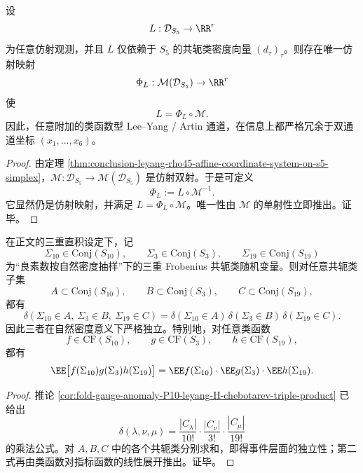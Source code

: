 \begin{theorem}[类函数型附加通道对双通道坐标的严格仿射冗余]\label{thm:conclusion-leyang-s5-classfunction-channels-factor-through-double-coordinates}
设
\[
L:\mathcal D_{S_5}\to \RR^r
\]
为任意仿射观测，并且 \(L\) 仅依赖于 \(S_5\) 的共轭类密度向量 \((d_\tau)_\tau\)。则存在唯一仿射映射
\[
\Phi_L:\mathcal M(\mathcal D_{S_5})\to \RR^r
\]
使
\[
L=\Phi_L\circ \mathcal M.
\]
因此，任意附加的类函数型 Lee--Yang / Artin 通道，在信息上都严格冗余于双通道坐标 \((x_1,\dots,x_6)\)。
\end{theorem}
\begin{proof}
由定理 \ref{thm:conclusion-leyang-rho45-affine-coordinate-system-on-s5-simplex}，\(\mathcal M:\mathcal D_{S_5}\to \mathcal M(\mathcal D_{S_5})\) 是仿射双射。于是可定义
\[
\Phi_L:=L\circ \mathcal M^{-1}.
\]
它显然仍是仿射映射，并满足 \(L=\Phi_L\circ \mathcal M\)。唯一性由 \(\mathcal M\) 的单射性立即推出。证毕。
\end{proof}

\begin{theorem}[算术三通道的精确张量独立]\label{thm:conclusion-leyang-arithmetic-three-channel-exact-independence}
在正文的三重直积设定下，记
\[
\Sigma_{10}\in \mathrm{Conj}(S_{10}),\qquad
\Sigma_{3}\in \mathrm{Conj}(S_{3}),\qquad
\Sigma_{19}\in \mathrm{Conj}(S_{19})
\]
为“良素数按自然密度抽样”下的三重 Frobenius 共轭类随机变量。则对任意共轭类子集
\[
A\subset \mathrm{Conj}(S_{10}),\qquad
B\subset \mathrm{Conj}(S_{3}),\qquad
C\subset \mathrm{Conj}(S_{19}),
\]
都有
\[
\delta(\Sigma_{10}\in A,\ \Sigma_3\in B,\ \Sigma_{19}\in C)
=
\delta(\Sigma_{10}\in A)\,
\delta(\Sigma_3\in B)\,
\delta(\Sigma_{19}\in C).
\]
因此三者在自然密度意义下严格独立。特别地，对任意类函数
\[
f\in \mathrm{CF}(S_{10}),\qquad
g\in \mathrm{CF}(S_{3}),\qquad
h\in \mathrm{CF}(S_{19}),
\]
都有
\[
\EE\bigl[f(\Sigma_{10})g(\Sigma_3)h(\Sigma_{19})\bigr]
=
\EE f(\Sigma_{10})\cdot \EE g(\Sigma_3)\cdot \EE h(\Sigma_{19}).
\]
\end{theorem}
\begin{proof}
推论 \ref{cor:fold-gauge-anomaly-P10-leyang-H-chebotarev-triple-product} 已给出
\[
\delta(\lambda,\nu,\mu)=\frac{|C_\lambda|}{10!}\cdot\frac{|C_\nu|}{3!}\cdot\frac{|C_\mu|}{19!}
\]
的乘法公式。对 \(A,B,C\) 中的各个共轭类分别求和，即得事件层面的独立性；第二式再由类函数对指标函数的线性展开推出。证毕。
\end{proof}


